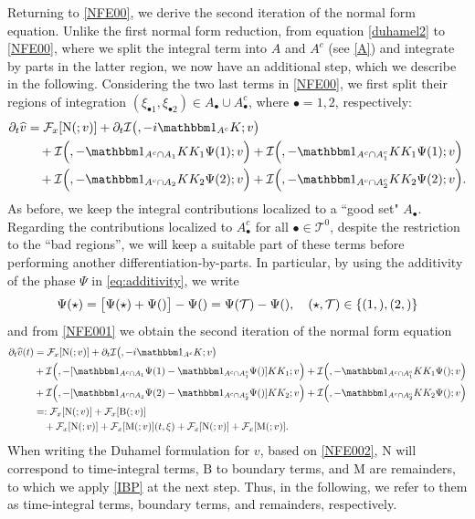 \documentclass[%
11pt,  reqno]{amsart}
\makeatletter
\newcommand{\5}{\textup{V}}
\newcommand{\ft}{\widehat}
\newcommand{\ind}{\mathbbm 1}
\newcommand{\dt}{\partial_t}
\theoremstyle{remark}
\newcommand{\bul}{\bullet}
\newcommand{\TT}{\mathcal{T}}
\newcommand{\Ft}{{\mathcal{F}}}
\def\<#1>{\csname MH@symb@#1\endcsname}
\def\distC{15}
\newcommand{\cherry}[3]{
	\begin{tikzpicture}[
		baseline=-8, scale=0.6, every node/.style={dotA},
		level distance=15pt,
		level 1/.style={sibling distance=\distC pt}
		]
		\node  [label=above:{$#1$}]  (root) {}
		child
		child
		;
		\node [label= left:{$#2$}]  at (root-1) {};
		\node [label= right:{$#3$}] at (root-2) {};
	\end{tikzpicture}
}
\newcommand{\Ical}{\mathcal{I}}
\numberwithin{equation}{section}
\numberwithin{theorem}{section}
\newcommand{\MM}{\mathrm{M}}
\newcommand{\NN}{\mathrm{N}}
\newcommand{\BB}{\mathrm{B}}
\makeatother
\begin{document}
Returning to \eqref{NFE00}, we derive the second iteration of the normal form equation. 
Unlike the first normal form reduction, from equation \eqref{duhamel2} to \eqref{NFE00}, where we split the integral term into $A$ and $A^c$ (see \eqref{A}) and integrate by parts in the latter region, we now have an additional step, which we describe in the following. Considering the two last terms in \eqref{NFE00}, we first split their regions of integration $(\xi_{\bul1}, \xi_{\bul2}) \in A_\bul \cup A_\bul^c$, where $\bul = 1,2$, respectively:
\begin{align}
\label{NFE001}
\dt\ft v
&
= 
 \Ft_x[ \NN ( \<1>; v )]  
+ 
\dt \Ical \big( \<1>, -i  \ind_{A^c} K; v \big)
\\
&
\quad 
+
\Ical \Big( \<21>, - \ind_{A^c \cap A_1} KK_1\Psi(1) ; v  \Big)  
+
\Ical \Big( \<21>, - \ind_{A^c \cap A_1^c} KK_1\Psi(1) ; v  \Big) 
\\
&
\quad 
+
\Ical \Big( \<22>, - \ind_{A^c \cap A_2} KK_2\Psi(2) ; v  \Big) 
+
\Ical \Big( \<22>, - \ind_{A^c \cap A_2^c} KK_2\Psi(2) ; v  \Big) .
\end{align}
As before, we keep the integral contributions localized to a ``good set" $A_\bul$. Regarding the contributions localized to $A_\bul^c$ for all $\bul\in \TT^0$, despite the restriction to the ``bad regions'', we will keep a suitable part of these terms before performing another differentiation-by-parts. In particular, by using the additivity of the phase $\Psi$ in \eqref{eq:additivity}, we write
\begin{align}
\Psi(\star) 
= \big[ \Psi(\star) + \Psi(\<1>) \big]- \Psi(\<1>) 
=
\Psi(\TT) - \Psi(\<1>),
\quad (\star, \TT)\in \left\{ (1, \<21>) , (2, \<22>) \right\}
\end{align}
and from \eqref{NFE001} we obtain the second iteration of the normal form equation
\begin{align}
\dt\ft v(t) 
&
= 
 \Ft_x[ \NN ( \<1>; v )] 
+ 
\dt \Ical \big( \<1>, - i  \ind_{A^c} K; v \big)
\\
&
+
\Ical \Big( \<21>, -[ \ind_{A^c \cap A_1} \Psi(1) - \ind_{A^c \cap A_1^c} \Psi(\<1>)  ]KK_1 ; v  \Big) 
+
\Ical \Big( \<21>, - \ind_{A^c \cap A_1^c} KK_1\Psi(\<21>) ; v  \Big) 
\\
&
+
\Ical \Big( \<22>, - [\ind_{A^c \cap A_2} \Psi(2) - \ind_{A^c \cap A_2^c} \Psi(\<1>)  ] KK_2; v  \Big) 
+
\Ical \Big( \<22>, - \ind_{A^c \cap A_2^c} KK_2\Psi(\<22>) ; v  \Big) 
\\
&
= : 
 \Ft_x[ \NN ( \<1>; v )]  
+ 
 \Ft_x[ 
\BB(\<1>;v)
] 
\\
&
\quad 
+ 
 \Ft_x[ 
\NN(\<21>; v )
] 
+
 \Ft_x[ 
\MM(\<21>; v )
] (t, \xi) 
+
 \Ft_x[ 
\NN(\<22>; v)
]  
+
 \Ft_x[ 
\MM(\<22>;v)
]  
.
\label{NFE002}
\end{align}
When writing the Duhamel formulation for $v$, based on \eqref{NFE002}, $\NN$ will correspond to time-integral terms, $\BB$ to boundary terms, and $\MM$ are remainders, to which we apply \eqref{IBP} at the next step. Thus, in the following, we refer to them as time-integral terms, boundary terms, and remainders, respectively.
\end{document}
